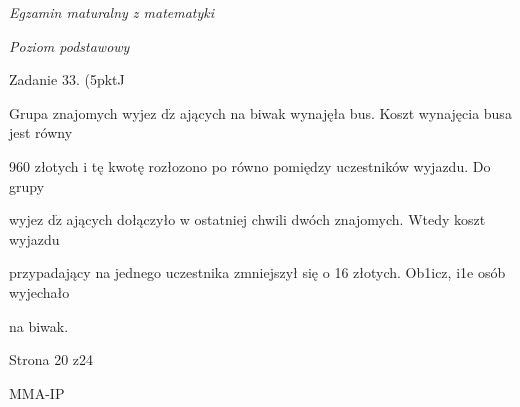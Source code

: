 \documentclass[a4paper,12pt]{article}
\begin{document}
{\it Egzamin maturalny z matematyki}

{\it Poziom podstawowy}

Zadanie 33. (5pktJ

Grupa znajomych wyjez $\mathrm{d}\dot{\mathrm{z}}$ ających na biwak wynajęła bus. Koszt wynajęcia busa jest równy

960 złotych i tę kwotę rozłozono po równo pomiędzy uczestników wyjazdu. Do grupy

wyjez $\mathrm{d}\dot{\mathrm{z}}$ ających dołączyło w ostatniej chwili dwóch znajomych. Wtedy koszt wyjazdu

przypadający na jednego uczestnika zmniejszył się o 16 złotych. Ob1icz, i1e osób wyjechało

na biwak.

Strona 20 z24

MMA-IP
\end{document}
